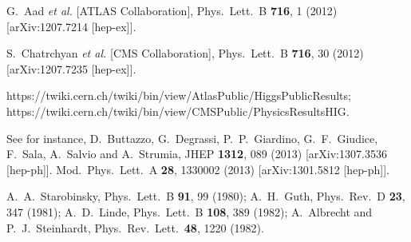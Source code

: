 \documentclass[aps,prd,preprint,superscriptaddress,showpacs,ctexart]{revtex4-1}
\begin{document}

\begin{thebibliography}{10}
 G.~Aad \textit{et al.} {[}ATLAS Collaboration{]},
 Phys.\ Lett.\ B \textbf{716}, 1 (2012) {[}arXiv:1207.7214 {[}hep-ex{]}{]}.

 S.~Chatrchyan \textit{et al.} {[}CMS Collaboration{]},
 Phys.\ Lett.\ B \textbf{716}, 30 (2012) {[}arXiv:1207.7235 {[}hep-ex{]}{]}.

 https://twiki.cern.ch/twiki/bin/view/AtlasPublic/HiggsPublicResults;
https://twiki.cern.ch/twiki/bin/view/CMSPublic/PhysicsResultsHIG.


 See for instance, D.~Buttazzo, G.~Degrassi, P.~P.~Giardino,
G.~F.~Giudice, F.~Sala, A.~Salvio and A.~Strumia, %
 JHEP \textbf{1312}, 089 (2013) %
 {[}arXiv:1307.3536 {[}hep-ph{]}{]}. %
 Mod.\ Phys.\ Lett.\ A \textbf{28}, 1330002 (2013) %
 {[}arXiv:1301.5812 {[}hep-ph{]}{]}. %



 A.~A.~Starobinsky,
 Phys.\ Lett.\ B \textbf{91}, 99 (1980);
%
 A.~H.~Guth,
 Phys.\ Rev.\ D \textbf{23}, 347 (1981);
%
A.~D.~Linde,
 Phys.\ Lett.\ B \textbf{108}, 389 (1982); %
%
 A.~Albrecht and P.~J.~Steinhardt,
 Phys.\ Rev.\ Lett.\ \textbf{48}, 1220 (1982). %





\end{thebibliography}
\end{document}

